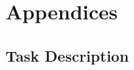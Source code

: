 \mainmatter %

\pagestyle{thesis} %





\subsubsection*{} %
\label{lastpage} %

\cleardoublepage
\backmatter
{}






\listoffigures %

\listoftables %


\glsaddall
\printglossary




\appendix %
\chapter{Appendices}
\setcounter{secnumdepth}{3}
\renewcommand{\thechapter}{A}
\section{Task Description}\label{sec:task-description}

